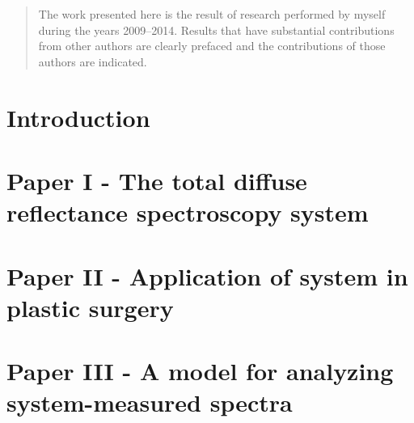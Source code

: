 \documentclass[letterpaper,12pt,twoside,openright]{report} %
\begin{document}
    \renewcommand{\abstractname}{Declaration of Academic Achievement}
    \begin{abstract} \thispagestyle{plain} \setcounter{page}{9} %
        The work presented here is the result of research performed by myself during the years 2009--2014. Results that have substantial contributions from other authors are clearly prefaced and the contributions of those authors are indicated.
    \end{abstract}
    

    \pagestyle{fancy}
    \fancyhead{}
    \fancyfoot{}
    \fancyfoot[CE,CO]{\thepage}



\chapter{Introduction}

\printbibliography[heading=subbibliography]

\chapter{Paper I - The total diffuse reflectance spectroscopy system}

\printbibliography[heading=subbibliography]

\chapter{Paper II - Application of system in plastic surgery}

\printbibliography[heading=subbibliography]

\chapter{Paper III - A model for analyzing system-measured spectra}

\printbibliography[heading=subbibliography]
\end{document}
